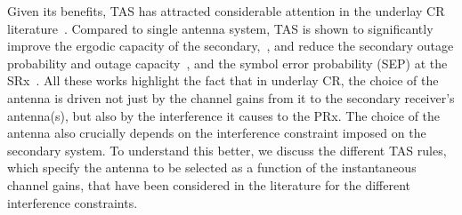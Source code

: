 \documentclass[12pt,draftcls,peerreview,onecolumn]{IEEEtran}
\begin{document}
Given its benefits, TAS has attracted considerable attention in the underlay CR literature~\cite{Zhou_2009_WCNC,Dmochowski_2011_CROWNCOM,Wang_2011_TCom,Zhou_2008_IET,Hanif_2015_globecom,Sarvendranath_2013_TCOM,Wang_2010_TWC,Kong_2011_JCN}. Compared to single antenna system, TAS is shown to significantly improve the ergodic capacity of the secondary,~\cite{Hanif_2015_globecom,Wang_2010_TWC}, and reduce the secondary outage probability and outage capacity~\cite{Kong_2011_JCN}, and the symbol error probability (SEP) at the SRx~\cite{Sarvendranath_2013_TCOM}. All these works highlight the fact that in underlay CR, the choice of the antenna is driven not just by the channel gains from it to the secondary receiver's antenna(s), but also by the interference it causes to the PRx. The choice of the antenna also crucially depends on the interference constraint imposed on the secondary system. To understand this better, we discuss the different TAS rules, which specify the antenna to be selected as a function of the instantaneous channel gains, that have been considered in the literature for the different interference constraints. 
%
\end{document}
